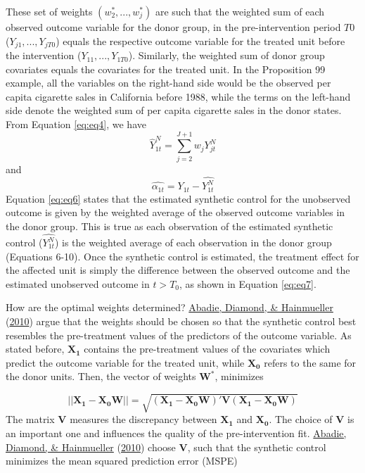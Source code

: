 \documentclass[12pt,nobind, a4paper]{reedthesis}
\begin{document}
 These set of weights \((w_{2}^{*},...,w_{j}^{*})\) are such that the weighted sum of each observed outcome variable for the donor group, in the pre-intervention period \(T0\) (\(Y_{j1},..., Y_{jT0}\)) equals the respective outcome variable for the treated unit before the intervention (\(Y_{11},...,Y_{1T0}\)). Similarly, the weighted sum of donor group covariates equals the covariates for the treated unit. In the Proposition 99 example, all the variables on the right-hand side would be the observed per capita cigarette sales in California before 1988, while the terms on the left-hand side denote the weighted sum of per capita cigarette sales in the donor states. From Equation \eqref{eq:eq4}, we have
 \begin{equation}
 \hat{Y}^{N}_{1t}=\sum_{j=2}^{J+1}w_{j}Y^{N}_{jt}
 \label{eq:eq6}
 \end{equation}
 and
 \begin{equation}
 \hat{\alpha_{1t}}={Y_{1t}}-\hat{Y^{N}_{1t}}
 \label{eq:eq7}
 \end{equation}
 Equation \eqref{eq:eq6} states that the estimated synthetic control for the unobserved outcome is given by the weighted average of the observed outcome variables in the donor group. This is true as each observation of the estimated synthetic control (\(\hat{Y^{N}_{1t}}\)) is the weighted average of each observation in the donor group (Equations 6-10). Once the synthetic control is estimated, the treatment effect for the affected unit is simply the difference between the observed outcome and the estimated unobserved outcome in \(t>T_0\), as shown in Equation \eqref{eq:eq7}.
 \linebreak

 How are the optimal weights determined? \protect\hyperlink{ref-abadie_synthetic_2010}{Abadie, Diamond, \& Hainmueller} (\protect\hyperlink{ref-abadie_synthetic_2010}{2010}) argue that the weights should be chosen so that the synthetic control best resembles the pre-treatment values of the predictors of the outcome variable. As stated before, \(\mathbf{X_1}\) contains the pre-treatment values of the covariates which predict the outcome variable for the treated unit, while \(\mathbf{X_0}\) refers to the same for the donor units. Then, the vector of weights \(\mathbf{W^*}\), minimizes

 \[||\mathbf{X_1}-\mathbf{X_0 W}||=\sqrt{(\mathbf{X_1}-\mathbf{X_0 W})' \mathbf{V} (\mathbf{X_1}-\mathbf{X_0 W})}\]
 The matrix \(\mathbf{V}\) measures the discrepancy between \(\mathbf{X_1}\) and \(\mathbf{X_0}\). The choice of \(\mathbf{V}\) is an important one and influences the quality of the pre-intervention fit. \protect\hyperlink{ref-abadie_synthetic_2010}{Abadie, Diamond, \& Hainmueller} (\protect\hyperlink{ref-abadie_synthetic_2010}{2010}) choose \(\mathbf{V}\), such that the synthetic control minimizes the mean squared prediction error (MSPE)
\end{document}
